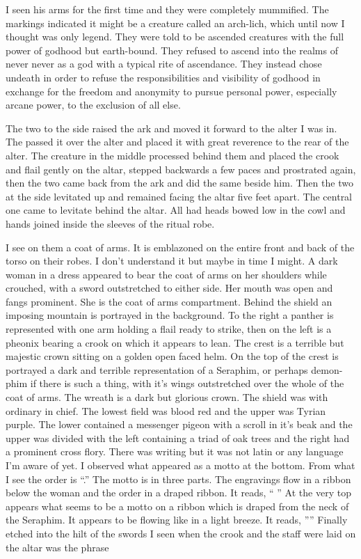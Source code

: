 I seen his arms for the first time and they were completely mummified. The markings indicated it might be a creature called an arch-lich, which until now I thought was only legend. They were told to be ascended creatures with the full power of godhood but earth-bound. They refused to ascend into the realms of never never as a god with a typical rite of ascendance. They instead chose undeath in order to refuse the responsibilities and visibility of godhood in exchange for the freedom and anonymity to pursue personal power, especially arcane power, to the exclusion of all else. 

The two to the side raised the ark and moved it forward to the alter I was in. The passed it over the alter and placed it with great reverence to the rear of the alter. The creature in the middle processed behind them and placed the crook and flail gently on the altar, stepped backwards a few paces and prostrated again, then the two came back from the ark and did the same beside him. Then the two at the side levitated up and remained facing the altar five feet apart. The central one came to levitate behind the altar. All had heads bowed low in the cowl and hands joined inside the sleeves of the ritual robe.

I see on them a coat of arms. It is emblazoned on the entire front and back of the torso on their robes. I don't understand it but maybe in time I might. A dark woman in a dress appeared to bear the coat of arms on her shoulders while crouched, with a sword outstretched to either side. Her mouth was open and fangs prominent. She is the coat of arms compartment. Behind the shield an imposing mountain is portrayed in the background. To the right a panther is represented with one arm holding a flail ready to strike, then on the left is a pheonix bearing a crook on which it appears to lean. The crest is a terrible but majestic crown sitting on a golden open faced helm. On the top of the crest is portrayed a dark and terrible representation of a Seraphim, or perhaps demon-phim if there is such a thing, with it's wings outstretched over the whole of the coat of arms. The wreath is a dark but glorious crown. The shield was with ordinary in chief. The lowest field was blood red and the upper was Tyrian purple. The lower contained a messenger pigeon with a scroll in it's beak and the upper was divided with the left containing a triad of oak trees and the right had a prominent cross flory. There was writing but it was not latin or any language I'm aware of yet. I observed what appeared as a motto at the bottom. From what I see the order is ``.'' The motto is in three parts. The engravings flow in a ribbon below the woman and the order in a draped ribbon. It reads, `` '' At the very top appears what seems to be a motto on a ribbon which is draped from the neck of the Seraphim. It appears to be flowing like in a light breeze. It reads, '''' Finally etched into the hilt of the swords I seen when the crook and the staff were laid on the altar was the phrase 

